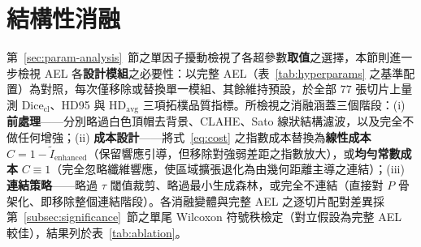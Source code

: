 \section{結構性消融}
\label{sec:ablation}

第~\ref{sec:param-analysis}~節之單因子擾動檢視了各超參數\textbf{取值}之選擇，本節則進一步檢視 AEL 各\textbf{設計模組}之必要性：以完整 AEL（表~\ref{tab:hyperparams} 之基準配置）為對照，每次僅移除或替換單一模組、其餘維持預設，於全部 $77$ 張切片上量測 $\text{Dice}_{\text{cl}}$、HD95 與 $\text{HD}_{\text{avg}}$ 三項拓樸品質指標。所檢視之消融涵蓋三個階段：(i) \textbf{前處理}——分別略過白色頂帽去背景、CLAHE、Sato 線狀結構濾波，以及完全不做任何增強；(ii) \textbf{成本設計}——將式~\eqref{eq:cost} 之指數成本替換為\textbf{線性成本} $C = 1 - \tilde{I}_{\text{enhanced}}$（保留響應引導，但移除對強弱差距之指數放大），或\textbf{均勻常數成本} $C \equiv 1$（完全忽略纖維響應，使區域擴張退化為由幾何距離主導之連結）；(iii) \textbf{連結策略}——略過 $\tau$ 閾值裁剪、略過最小生成森林，或完全不連結（直接對 $P$ 骨架化、即移除整個連結階段）。各消融變體與完整 AEL 之逐切片配對差異採第~\ref{subsec:significance}~節之單尾 Wilcoxon 符號秩檢定（對立假設為完整 AEL 較佳），結果列於表~\ref{tab:ablation}。

